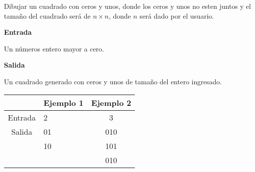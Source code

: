 
\question Dibujar un cuadrado con ceros y unos, donde los ceros y unos
          no esten juntos y el tamaño del cuadrado será de $n \times n$,
          donde $n$ será dado por el usuario.

\textbf{Entrada}

Un números entero mayor a cero.

\textbf{Salida}

Un cuadrado generado con ceros y unos de tamaño del entero ingresado.

\begin{center}
  \begin{tabular}{|c|l|c|}
     \hline
     \rowcolor[HTML]{C0C0C0}
             & Ejemplo 1 & Ejemplo 2 \\
     \hline
     Entrada & 2         &  3 \\
     \hline
     Salida  & 01 & 010 \\
             & 10 & 101 \\
             &    & 010 \\
     \hline
  \end{tabular}
\end{center}

